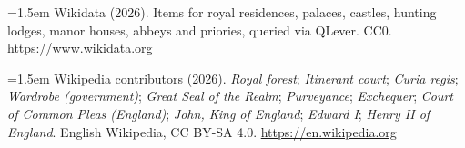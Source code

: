 \documentclass[11pt,a4paper]{article}
\begin{document}
\hangindent=1.5em Wikidata (2026). Items for royal residences, palaces, castles, hunting lodges, manor houses, abbeys and priories, queried via QLever. CC0. \url{https://www.wikidata.org}

\hangindent=1.5em Wikipedia contributors (2026). \textit{Royal forest}; \textit{Itinerant court}; \textit{Curia regis}; \textit{Wardrobe (government)}; \textit{Great Seal of the Realm}; \textit{Purveyance}; \textit{Exchequer}; \textit{Court of Common Pleas (England)}; \textit{John, King of England}; \textit{Edward I}; \textit{Henry II of England}. English Wikipedia, CC BY-SA 4.0. \url{https://en.wikipedia.org}
\end{document}
